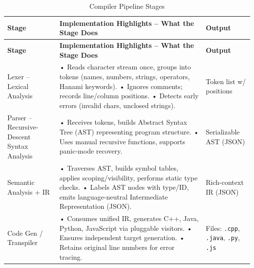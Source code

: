 \documentclass[conference]{IEEEtran}
\begin{document}
\begin{center} %
\begin{longtable}{|>{\raggedright\arraybackslash}p{1.8cm}|>{\raggedright\arraybackslash}p{3.5cm}|>{\raggedright\arraybackslash}p{1.8cm}|}
\caption{Compiler Pipeline Stages} \label{table:pipeline} \\ %
\hline
\textbf{Stage} & \textbf{Implementation Highlights – What the Stage Does} & \textbf{Output} \\
\hline
\endfirsthead
\hline
\textbf{Stage} & \textbf{Implementation Highlights – What the Stage Does} & \textbf{Output} \\
\hline
\endhead
\hline
\endfoot
\hline
\endlastfoot
Lexer – Lexical Analysis &
• Reads character stream once, groups into tokens (names, numbers, strings, operators, Hanami keywords). \newline
• Ignores comments; records line/column positions. \newline
• Detects early errors (invalid chars, unclosed strings). &
Token list w/ positions \\
\hline
Parser – Recursive-Descent Syntax Analysis &
• Receives tokens, builds Abstract Syntax Tree (AST) representing program structure. \newline
• Uses manual recursive functions, supports panic-mode recovery. &
Serializable AST (JSON) \\
\hline
Semantic Analysis + IR &
• Traverses AST, builds symbol tables, applies scoping/visibility, performs static type checks. \newline
• Labels AST nodes with type/ID, emits language-neutral Intermediate Representation (JSON). &
Rich-context IR (JSON) \\
\hline
Code Gen / Transpiler &
• Consumes unified IR, generates C++, Java, Python, JavaScript via pluggable visitors. \newline
• Ensures independent target generation. \newline
• Retains original line numbers for error tracing. &
Files: \texttt{.cpp}, \texttt{.java}, \texttt{.py}, \texttt{.js} \\
\hline
\end{longtable}
\end{center}
\end{document}
